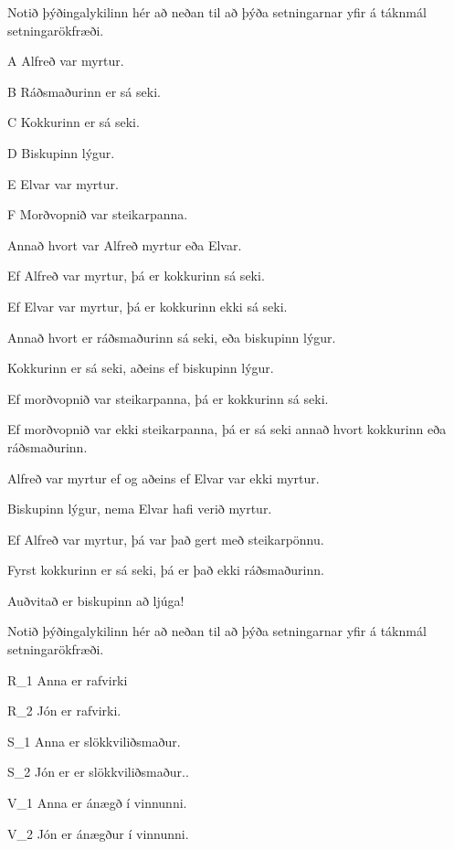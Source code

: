 \problempart Notið þýðingalykilinn hér að neðan til að þýða setningarnar yfir á táknmál setningarökfræði.
\begin{ekey}
\item[A] Alfreð var myrtur.
\item[B] Ráðsmaðurinn er sá seki.
\item[C] Kokkurinn er sá seki.
\item[D] Biskupinn lýgur.
\item[E] Elvar var myrtur.
\item[F] Morðvopnið var steikarpanna.
\end{ekey}
\begin{earg}
\item Annað hvort var Alfreð myrtur eða Elvar.
\item Ef Alfreð var myrtur, þá er kokkurinn sá seki.
\item Ef Elvar var myrtur, þá er kokkurinn ekki sá seki.
\item Annað hvort er ráðsmaðurinn sá seki, eða biskupinn lýgur.
\item Kokkurinn er sá seki, aðeins ef biskupinn lýgur.
\item Ef morðvopnið var steikarpanna, þá er kokkurinn sá seki.
\item Ef morðvopnið var ekki steikarpanna, þá er sá seki annað hvort kokkurinn eða ráðsmaðurinn.
\item Alfreð var myrtur ef og aðeins ef Elvar var ekki myrtur.
\item Biskupinn lýgur, nema Elvar hafi verið myrtur.
\item Ef Alfreð var myrtur, þá var það gert með steikarpönnu.
\item Fyrst kokkurinn er sá seki, þá er það ekki ráðsmaðurinn.
\item Auðvitað er biskupinn að ljúga!

\end{earg}
\problempart Notið þýðingalykilinn hér að neðan til að þýða setningarnar yfir á táknmál setningarökfræði.\label{pr.avacareer}
	\begin{ekey}
		\item[R_1] Anna er rafvirki
		\item[R_2] Jón er rafvirki.
		\item[S_1] Anna er slökkviliðsmaður.
		\item[S_2] Jón er er slökkviliðsmaður..
		\item[V_1] Anna er ánægð í vinnunni.
		\item[V_2] Jón er ánægður í vinnunni.
	\end{ekey}
